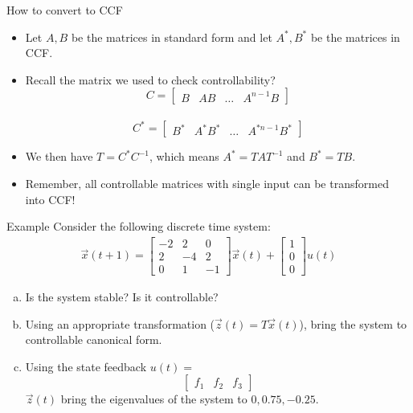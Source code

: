 \documentclass{beamer}
\begin{document}
	\begin{frame}{How to convert to CCF}
	\begin{itemize}
	    \item Let $A,B$ be the matrices in standard form and let $A^*,B^*$ be the matrices in CCF. \pause
	    \item Recall the matrix we used to check controllability?\\ \pause 
	    \[C = \begin{bmatrix}
	               B & AB & \hdots & A^{n-1}B
	            \end{bmatrix}\] \\  
	    \[ C^* = \begin{bmatrix}
	               B^*& A^*B^* & \hdots & A^{*n-1}B^*
	            \end{bmatrix}\]
	    \item We then have $T = C^*C^{-1}$,  which means  $A^* = TAT^{-1}$ and $B^* = TB$.
	    \item Remember, all controllable matrices with single input can be transformed into CCF!
	\end{itemize}
	\end{frame}

	\begin{frame}{Example}
	Consider the following discrete time system:
	\begin{align*}
	    \vec{x}(t+1) = \begin{bmatrix} 
	            -2&2&0\\
	            2&-4&2\\ 
	            0&1&-1
	            \end{bmatrix}\vec{x}(t) + \begin{bmatrix} 1 \\ 0 \\0 \end{bmatrix}u(t) 
	\end{align*}

	\begin{enumerate}[(a)]
	    \item Is the system stable? Is it controllable? 
	    \item Using an appropriate transformation ($\vec{z}(t) = T\vec{x}(t)$), bring the system to controllable canonical form. 
	    \item Using the state feedback $u(t) =$ \[\begin{bmatrix} f_1 & f_2 & f_3  \end{bmatrix}\] $\vec{z}(t)$ bring the eigenvalues of the system to $0,0.75, -0.25$.
	\end{enumerate}
	\end{frame}
\end{document}
